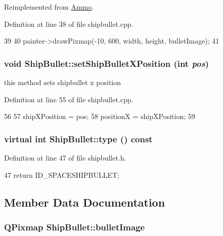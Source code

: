 Reimplemented from \hyperlink{class_ammo_a3f4c8157fab369e46bac4bb88348d8c1}{Ammo}.

Definition at line 38 of file shipbullet.cpp.


\begin{DoxyCode}
39 {
40     painter->drawPixmap(-10, 600, width, height, bulletImage);
41 }
\end{DoxyCode}
\hypertarget{class_ship_bullet_a8953a899414d57e0834c8aa98e5d3b70}{
\subsubsection[{setShipBulletXPosition}]{\setlength{\rightskip}{0pt plus 5cm}void ShipBullet::setShipBulletXPosition (int {\em pos})}}
\label{class_ship_bullet_a8953a899414d57e0834c8aa98e5d3b70}
this method sets shipbullet x position 

Definition at line 55 of file shipbullet.cpp.


\begin{DoxyCode}
56 {
57     shipXPosition = pos;
58     positionX = shipXPosition;
59 }
\end{DoxyCode}
\hypertarget{class_ship_bullet_a9645812da4c374f7e759c00c39cb01aa}{
\subsubsection[{type}]{\setlength{\rightskip}{0pt plus 5cm}virtual int ShipBullet::type () const}}
\label{class_ship_bullet_a9645812da4c374f7e759c00c39cb01aa}


Definition at line 47 of file shipbullet.h.


\begin{DoxyCode}
47 {return ID_SPACESHIPBULLET; }
\end{DoxyCode}


\subsection{Member Data Documentation}
\hypertarget{class_ship_bullet_a22ad763541149d9823794297307b5a63}{
\subsubsection[{bulletImage}]{\setlength{\rightskip}{0pt plus 5cm}QPixmap {\bf ShipBullet::bulletImage}}}
\label{class_ship_bullet_a22ad763541149d9823794297307b5a63}


